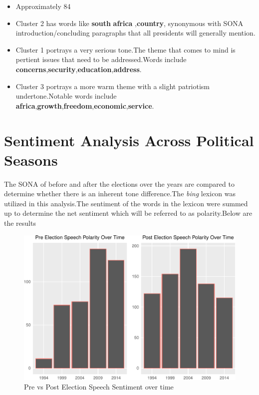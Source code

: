 \documentclass[]{article}
\begin{document}
\begin{itemize}

\item Approximately 84%
\item Cluster 2 has words like \textbf{south} \textbf{africa} ,\textbf{country}, synonymous with SONA introduction/concluding paragraphs that all presidents will generally mention.
\item Cluster 1 portrays a very serious tone.The theme that comes to mind is pertient issues that need to be addressed.Words include \textbf{concerns},\textbf{security},\textbf{education},\textbf{address}.
\item Cluster 3 portrays a more warm theme with a slight patriotism undertone.Notable words include \textbf{africa},\textbf{growth},\textbf{freedom},\textbf{economic},\textbf{service}.
\end{itemize}

\section{Sentiment Analysis Across Political Seasons}

The SONA of before and after the elections over the years are compared
to determine whether there is an inherent tone difference.The
\emph{bing} lexicon was utilized in this analysis.The sentiment of the
words in the lexicon were summed up to determine the net sentiment which
will be referred to as polarity.Below are the results

\begin{figure}[H]

{\centering \includegraphics{datasci_fi_Assignment_2_files/figure-latex/pre_post_sentiment -1} 

}

\caption{Pre vs Post Election Speech Sentiment over time}\label{fig:pre_post_sentiment }
\end{figure}
\end{document}

